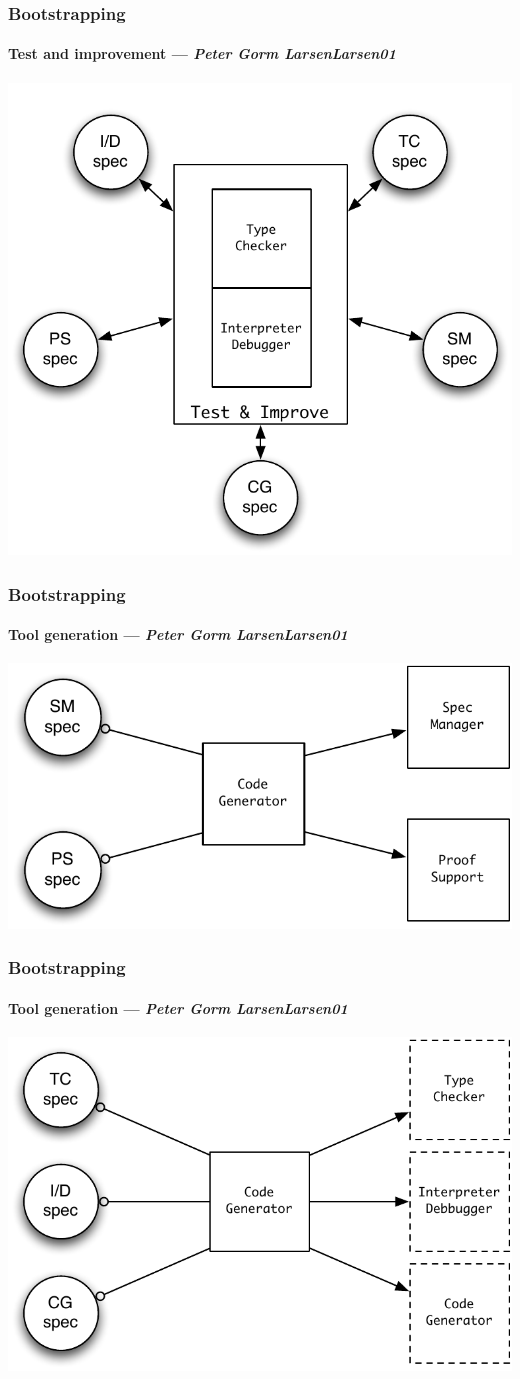 \documentclass[slidestop,uncompress,mathserif,notes]{beamer}
\newcommand{\pgl}[1]{Peter Gorm Larsen}
\begin{document}
\begin{frame}[c]
  \frametitle{Bootstrapping}
  \framesubtitle{Test and improvement --- \emph{\pgl \cite{Larsen01}}}
 
  \begin{center}
    \includegraphics[width=.6\textwidth]{images/test_improve.pdf}
  \end{center}
\end{frame}

\begin{frame}[c]
  \frametitle{Bootstrapping}
  \framesubtitle{Tool generation --- \emph{\pgl \cite{Larsen01}}}

  \begin{center}
    \includegraphics[width=.7\textwidth]{images/code_gen.pdf}
  \end{center}
\end{frame}

\begin{frame}[c]
  \frametitle{Bootstrapping}
  \framesubtitle{Tool generation --- \emph{\pgl \cite{Larsen01}}}
 
  \begin{center}
    \includegraphics[width=.7\textwidth]{images/code_gen2.pdf}
  \end{center}
\end{frame}
\end{document}
